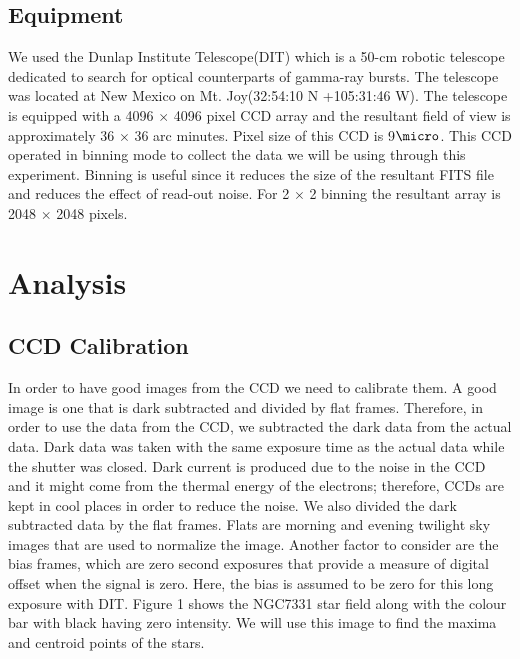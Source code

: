 \documentclass[letterpaper,12pt]{article}
\begin{document}
\subsection{Equipment}
We used the Dunlap Institute Telescope(DIT) which is a 50-cm robotic telescope dedicated to search for optical counterparts of gamma-ray bursts. The telescope was located at New Mexico on Mt. Joy(32:54:10 N +105:31:46 W).  The telescope is equipped with a 4096 \begin{math}\times\end{math} 4096 pixel CCD array and the resultant field of view is approximately 36 \begin{math}\times\end{math} 36 arc minutes. Pixel size of this CCD is 9\begin{math}\micro\end{math}. This CCD operated in binning mode to collect the data we will be using through this experiment. Binning is useful since it reduces the size of the resultant FITS file and reduces the effect of read-out noise. For 2 \begin{math}\times\end{math} 2 binning the resultant array is 2048 \begin{math}\times\end{math} 2048 pixels.



\section{Analysis}
\label{analysis}
\subsection{CCD Calibration}
In order to have good images from the CCD we need to calibrate them. A good image is one that is dark subtracted and divided by flat frames. Therefore, in order to use the data from the CCD, we subtracted the dark data from the actual data. Dark data was taken with the same exposure time as the actual data while  the shutter was closed. Dark current is produced due to the noise in the CCD and it might come from the thermal energy of the electrons; therefore, CCDs are kept in cool places in order to reduce the noise. We also divided the dark subtracted data by the flat frames. Flats are morning and evening twilight sky images that are used to normalize the image. Another factor to consider are the bias frames, which are zero second exposures that provide a measure of digital offset when the signal is zero. Here, the bias is assumed to be zero for this long exposure with DIT. Figure 1 shows the NGC7331 star field along with the colour bar with black having zero intensity. We will use this image to find the maxima and centroid points of the stars.
\end{document}
